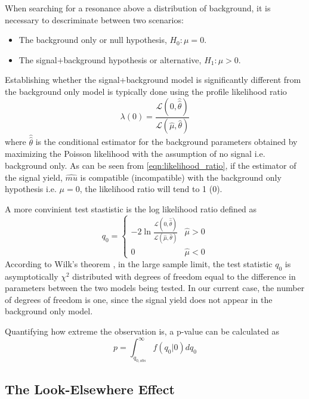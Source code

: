 When searching for a resonance above a distribution of background, it is 
necessary to descriminate between two scenarios:
\begin{itemize}
    \item The background only or null hypothesis, $H_{0}: \mu = 0$.
    \item The signal+background hypothesis or alternative, $H_{1}: \mu > 0$.
\end{itemize}
Establishing whether the signal+background model is significantly different 
from the background only model is typically done using the profile likelihood
ratio
\begin{equation}
    \lambda(0) = \frac{\mathcal{L}(0, \hat{\hat{\theta}})}{\mathcal{L}(\hat{\mu}, \hat{\theta})}
    \label{eqn:likelihood_ratio}
\end{equation}
where $\hat{\hat{\theta}}$ is the conditional estimator for the background 
parameters obtained by maximizing the Poisson likelihood with the assumption
of no signal i.e. background only.  As can be seen from \ref{eqn:likelihood_ratio}, 
if the estimator of the signal yield, $\hat{mu}$ is compatible (incompatible) with the background
only hypothesis i.e. $\mu = 0$, the likelihood ratio will tend to 1 (0).

A more convinient test stastistic is the log likelihood ratio defined as
\begin{equation}
    q_0 = \begin{cases}
            -2 \ln \frac{\mathcal{L}(0, \hat{\hat{\theta}})}{\mathcal{L}(\hat{\mu}, \hat{\theta})} 
            & \hat{\mu} > 0 \\
             0  & \hat{\mu} < 0
        \end{cases}
\end{equation}
According to Wilk's theorem \cite{Wilks:1938dza}, in the large sample limit, the test statistic
$q_0$ is asymptotically $\chi^2$ distributed with degrees of freedom equal to the
difference in parameters between the two models being tested.  In our current case, 
the number of degrees of freedom is one, since the signal yield does not appear in
the background only model.

Quantifying how extreme the observation is, a p-value can be calculated as
\begin{equation}
    p = \int_{q_{0,obs}}^{\infty} f(q_{0} | 0) dq_{0}
\end{equation} 

\subsection{The Look-Elsewhere Effect}



